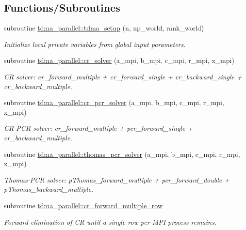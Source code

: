 \subsection*{Functions/\+Subroutines}
\begin{DoxyCompactItemize}
\item 
subroutine \mbox{\hyperlink{namespacetdma__parallel_a7aa2a590feb83632170b7cb7b74fefd3}{tdma\+\_\+parallel\+::tdma\+\_\+setup}} (n, np\+\_\+world, rank\+\_\+world)
\begin{DoxyCompactList}\small\item\em Initialize local private variables from global input parameters. \end{DoxyCompactList}\item 
subroutine \mbox{\hyperlink{namespacetdma__parallel_abfb0b9e0d8e67acbd6d8cfa390faee6a}{tdma\+\_\+parallel\+::cr\+\_\+solver}} (a\+\_\+mpi, b\+\_\+mpi, c\+\_\+mpi, r\+\_\+mpi, x\+\_\+mpi)
\begin{DoxyCompactList}\small\item\em CR solver\+: cr\+\_\+forward\+\_\+multiple + cr\+\_\+forward\+\_\+single + cr\+\_\+backward\+\_\+single + cr\+\_\+backward\+\_\+multiple. \end{DoxyCompactList}\item 
subroutine \mbox{\hyperlink{namespacetdma__parallel_a5b221ee60f9b10b484cd5439f5b485f0}{tdma\+\_\+parallel\+::cr\+\_\+pcr\+\_\+solver}} (a\+\_\+mpi, b\+\_\+mpi, c\+\_\+mpi, r\+\_\+mpi, x\+\_\+mpi)
\begin{DoxyCompactList}\small\item\em C\+R-\/\+P\+CR solver\+: cr\+\_\+forward\+\_\+multiple + pcr\+\_\+forward\+\_\+single + cr\+\_\+backward\+\_\+multiple. \end{DoxyCompactList}\item 
subroutine \mbox{\hyperlink{namespacetdma__parallel_a03041ff2dce526db1fed51ab87b84da5}{tdma\+\_\+parallel\+::thomas\+\_\+pcr\+\_\+solver}} (a\+\_\+mpi, b\+\_\+mpi, c\+\_\+mpi, r\+\_\+mpi, x\+\_\+mpi)
\begin{DoxyCompactList}\small\item\em Thomas-\/\+P\+CR solver\+: p\+Thomas\+\_\+forward\+\_\+multiple + pcr\+\_\+forward\+\_\+double + p\+Thomas\+\_\+backward\+\_\+multiple. \end{DoxyCompactList}\item 
subroutine \mbox{\hyperlink{namespacetdma__parallel_afc500f1450d23091f136330208ca4519}{tdma\+\_\+parallel\+::cr\+\_\+forward\+\_\+multiple\+\_\+row}}
\begin{DoxyCompactList}\small\item\em Forward elimination of CR until a single row per M\+PI process remains. \end{DoxyCompactList}\item 

\end{DoxyCompactItemize}
